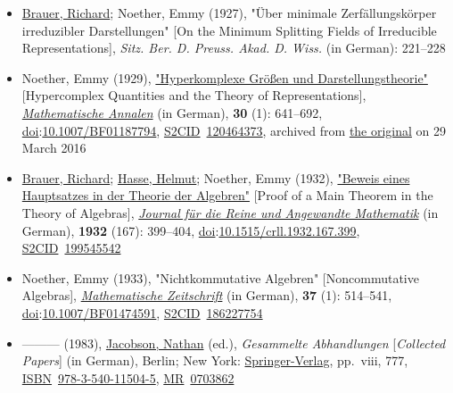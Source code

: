 \begin{itemize}
\item
  \href{https://en.wikipedia.org/wiki/Richard_Brauer}{Brauer, Richard}; Noether, Emmy (1927), "Über minimale Zerfällungskörper irreduzibler Darstellungen" {{[}}On the Minimum Splitting Fields of Irreducible Representations{{]}}, \emph{Sitz. Ber. D. Preuss. Akad. D. Wiss.} (in German): {221--}228{}
\item
  Noether, Emmy (1929), \href{https://web.archive.org/web/20160329230805/http://gdz.sub.uni-goettingen.de/index.php?id=11&PPN=GDZPPN002371448&L=1}{"Hyperkomplexe Größen und Darstellungstheorie"} {{[}}Hypercomplex Quantities and the Theory of Representations{{]}}, \emph{\href{https://en.wikipedia.org/wiki/Mathematische_Annalen}{Mathematische Annalen}} (in German), \textbf{30} (1): {641--}692, \href{https://en.wikipedia.org/wiki/Doi_(identifier)}{doi}:\href{https://doi.org/10.1007\%2FBF01187794}{10.1007/BF01187794}, \href{https://en.wikipedia.org/wiki/S2CID_(identifier)}{S2CID}{~}\href{https://api.semanticscholar.org/CorpusID:120464373}{120464373}, archived from \href{http://gdz.sub.uni-goettingen.de/index.php?id=11&PPN=GDZPPN002371448&L=1}{the original} on 29 March 2016{}
\item
  \href{https://en.wikipedia.org/wiki/Richard_Brauer}{Brauer, Richard}; \href{https://en.wikipedia.org/wiki/Helmut_Hasse}{Hasse, Helmut}; Noether, Emmy (1932), \href{http://gdz.sub.uni-goettingen.de/no_cache/dms/load/img/?IDDOC=260847}{"Beweis eines Hauptsatzes in der Theorie der Algebren"} {{[}}Proof of a Main Theorem in the Theory of Algebras{{]}}, \emph{\href{https://en.wikipedia.org/wiki/Journal_für_die_Reine_und_Angewandte_Mathematik}{Journal für die Reine und Angewandte Mathematik}} (in German), \textbf{1932} (167): {399--}404, \href{https://en.wikipedia.org/wiki/Doi_(identifier)}{doi}:\href{https://doi.org/10.1515\%2Fcrll.1932.167.399}{10.1515/crll.1932.167.399}, \href{https://en.wikipedia.org/wiki/S2CID_(identifier)}{S2CID}{~}\href{https://api.semanticscholar.org/CorpusID:199545542}{199545542}{}
\item
  Noether, Emmy (1933), "Nichtkommutative Algebren" {{[}}Noncommutative Algebras{{]}}, \emph{\href{https://en.wikipedia.org/wiki/Mathematische_Zeitschrift}{Mathematische Zeitschrift}} (in German), \textbf{37} (1): {514--}541, \href{https://en.wikipedia.org/wiki/Doi_(identifier)}{doi}:\href{https://doi.org/10.1007\%2FBF01474591}{10.1007/BF01474591}, \href{https://en.wikipedia.org/wiki/S2CID_(identifier)}{S2CID}{~}\href{https://api.semanticscholar.org/CorpusID:186227754}{186227754}{}
\item
  {---}{---}{---} (1983), \href{https://en.wikipedia.org/wiki/Nathan_Jacobson}{Jacobson, Nathan} (ed.), \emph{Gesammelte Abhandlungen} {{[}}\emph{Collected Papers}{{]}} (in German), Berlin; New York: \href{https://en.wikipedia.org/wiki/Springer-Verlag}{Springer-Verlag}, pp.{~}viii, 777, \href{https://en.wikipedia.org/wiki/ISBN_(identifier)}{ISBN}{~}\href{https://en.wikipedia.org/wiki/Special:BookSources/978-3-540-11504-5}{978-3-540-11504-5}, \href{https://en.wikipedia.org/wiki/MR_(identifier)}{MR}{~}\href{https://mathscinet.ams.org/mathscinet-getitem?mr=0703862}{0703862}{}
\end{itemize}



